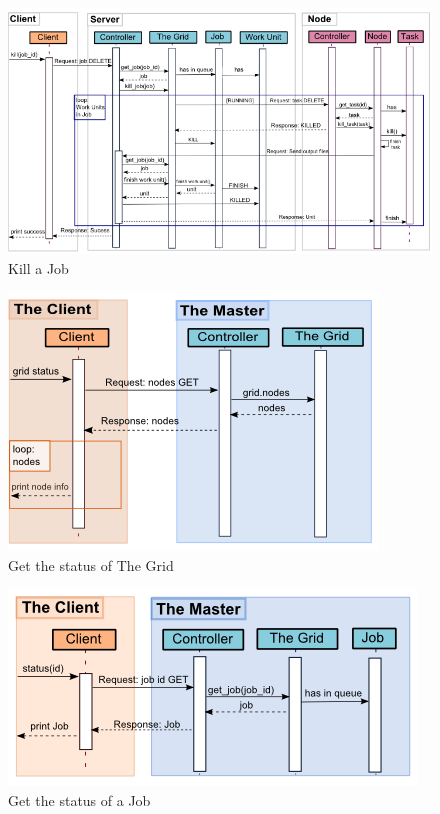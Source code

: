 \begin{figure}[htbp]
\centering
\includegraphics[keepaspectratio,width=\textwidth,height=0.75\textheight]{./figs/deletion.png}
\caption{Kill a Job}
\end{figure}


\begin{figure}[htbp]
\centering
\includegraphics[keepaspectratio,width=\textwidth,height=0.75\textheight]{./figs/gridstatus.png}
\caption{Get the status of The Grid}
\end{figure}


\begin{figure}[htbp]
\centering
\includegraphics[keepaspectratio,width=\textwidth,height=0.75\textheight]{./figs/jobget.png}
\caption{Get the status of a Job}
\end{figure}


